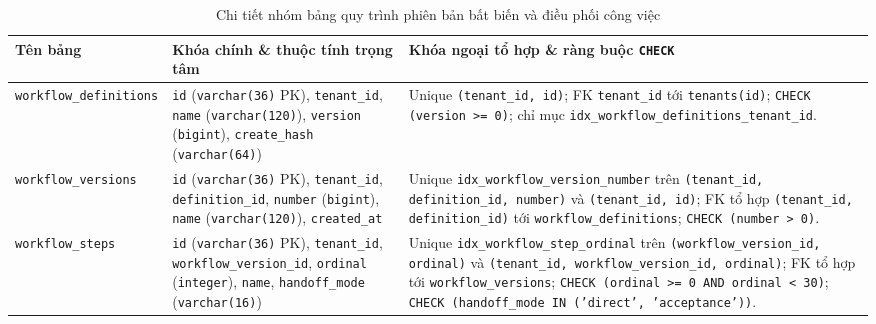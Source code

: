 \begin{table}[htbp]
  \centering
  \footnotesize
  \setlength{\tabcolsep}{4pt}
  \renewcommand{\arraystretch}{1.15}
  \caption{Chi tiết nhóm bảng quy trình phiên bản bất biến và điều phối công việc}\label{tab:app-workflows}
  \begin{tabularx}{\linewidth}{@{}
    >{\raggedright\arraybackslash}p{3.2cm}
    >{\raggedright\arraybackslash}p{5.2cm}
    >{\raggedright\arraybackslash}X@{}}
    \toprule
    Tên bảng & Khóa chính \& thuộc tính trọng tâm & Khóa ngoại tổ hợp \& ràng buộc \texttt{CHECK} \\
    \midrule
    \texttt{workflow\_\hspace{0pt}definitions} &
    \texttt{id} (\texttt{varchar(36)} PK), \texttt{tenant\_id}, \texttt{name} (\texttt{varchar(120)}), \texttt{version} (\texttt{bigint}), \texttt{create\_hash} (\texttt{varchar(64)}) &
    Unique \texttt{(tenant\_id, id)}; FK \texttt{tenant\_id} tới \texttt{tenants(id)}; \texttt{CHECK (version >= 0)}; chỉ mục \texttt{idx\_\hspace{0pt}workflow\_\hspace{0pt}definitions\_\hspace{0pt}tenant\_id}. \\
    \texttt{workflow\_\hspace{0pt}versions} &
    \texttt{id} (\texttt{varchar(36)} PK), \texttt{tenant\_id}, \texttt{definition\_id}, \texttt{number} (\texttt{bigint}), \texttt{name} (\texttt{varchar(120)}), \texttt{created\_at} &
    Unique \texttt{idx\_\hspace{0pt}workflow\_\hspace{0pt}version\_\hspace{0pt}number} trên \texttt{(tenant\_id, definition\_id, number)} và \texttt{(tenant\_id, id)}; FK tổ hợp \texttt{(tenant\_id, definition\_id)} tới \texttt{workflow\_\hspace{0pt}definitions}; \texttt{CHECK (number > 0)}. \\
    \texttt{workflow\_\hspace{0pt}steps} &
    \texttt{id} (\texttt{varchar(36)} PK), \texttt{tenant\_id}, \texttt{workflow\_version\_id}, \texttt{ordinal} (\texttt{integer}), \texttt{name}, \texttt{handoff\_mode} (\texttt{varchar(16)}) &
    Unique \texttt{idx\_\hspace{0pt}workflow\_\hspace{0pt}step\_\hspace{0pt}ordinal} trên \texttt{(workflow\_version\_id, ordinal)} và \texttt{(tenant\_id, workflow\_version\_id, ordinal)}; FK tổ hợp tới \texttt{workflow\_\hspace{0pt}versions}; \texttt{CHECK (ordinal >= 0 AND ordinal < 30)}; \texttt{CHECK (handoff\_mode IN ('direct', 'acceptance'))}. \\

\end{tabularx}
\end{table}
